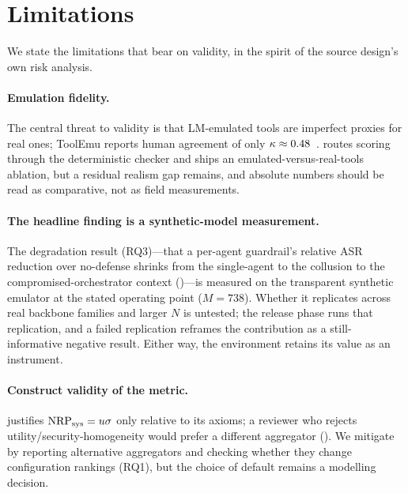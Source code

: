 \section{Limitations}
\label{sec:limitations}

We state the limitations that bear on validity, in the spirit of the source design's own
risk analysis.

\paragraph{Emulation fidelity.} The central threat to validity is that LM-emulated tools
are imperfect proxies for real ones; ToolEmu reports human agreement of only
$\kappa\approx0.48$~\cite{ruan2024toolemu}.  routes scoring through the
deterministic checker and ships an emulated-versus-real-tools ablation, but a residual
realism gap remains, and absolute numbers should be read as comparative, not as field
measurements.

\paragraph{The headline finding is a synthetic-model measurement.} The degradation
result (RQ3)---that a per-agent guardrail's relative ASR reduction over no-defense shrinks
from the single-agent to the collusion to the compromised-orchestrator context
()---is measured on the transparent synthetic emulator at the stated
operating point ($M{=}738$). Whether it replicates across real backbone families and larger
$N$ is untested; the release phase runs that replication, and
a failed replication reframes the contribution as a still-informative negative result.
Either way, the environment retains its value as an instrument.

\paragraph{Construct validity of the metric.}  justifies $\mathrm{NRP}_{\mathrm{sys}}=u\sigma$
only relative to its axioms; a reviewer who rejects utility/security-homogeneity would
prefer a different aggregator (). We mitigate by reporting alternative
aggregators and checking whether they change configuration rankings (RQ1), but the choice of
default remains a modelling decision.

